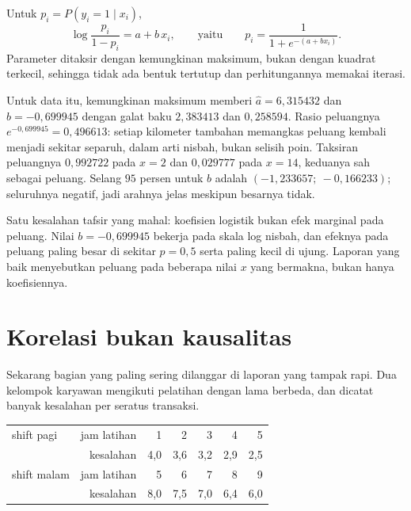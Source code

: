 \begin{definisi}
Untuk $p_i=P(y_i=1\mid x_i)$,
\[
\log\frac{p_i}{1-p_i}=a+b\,x_i,
\qquad\text{yaitu}\qquad
p_i=\frac{1}{1+e^{-(a+bx_i)}} .
\]
Parameter ditaksir dengan kemungkinan maksimum, bukan dengan kuadrat terkecil, sehingga
tidak ada bentuk tertutup dan perhitungannya memakai iterasi.
\end{definisi}


Untuk data itu, kemungkinan maksimum memberi $\hat a=6{,}315432$ dan $\hat b=-0{,}699945$
dengan galat baku $2{,}383413$ dan $0{,}258594$. Rasio peluangnya
$e^{-0{,}699945}=0{,}496613$: setiap kilometer tambahan memangkas peluang kembali
menjadi sekitar separuh, dalam arti nisbah, bukan selisih poin. Taksiran peluangnya
$0{,}992722$ pada $x=2$ dan $0{,}029777$ pada $x=14$, keduanya sah sebagai peluang.
Selang $95$ persen untuk $b$ adalah $(-1{,}233657;\ -0{,}166233)$; seluruhnya negatif,
jadi arahnya jelas meskipun besarnya tidak.

Satu kesalahan tafsir yang mahal: koefisien logistik bukan efek marginal pada peluang.
Nilai $b=-0{,}699945$ bekerja pada skala log nisbah, dan efeknya pada peluang paling
besar di sekitar $p=0{,}5$ serta paling kecil di ujung. Laporan yang baik menyebutkan
peluang pada beberapa nilai $x$ yang bermakna, bukan hanya koefisiennya.

\section{Korelasi bukan kausalitas}

Sekarang bagian yang paling sering dilanggar di laporan yang tampak rapi. Dua kelompok
karyawan mengikuti pelatihan dengan lama berbeda, dan dicatat banyak kesalahan per
seratus transaksi.

\begin{center}
\small
\begin{tabular}{l*{6}{r}}
\hline
shift pagi  & jam latihan & 1 & 2 & 3 & 4 & 5 \\
            & kesalahan   & 4,0 & 3,6 & 3,2 & 2,9 & 2,5 \\
\hline
shift malam & jam latihan & 5 & 6 & 7 & 8 & 9 \\
            & kesalahan   & 8,0 & 7,5 & 7,0 & 6,4 & 6,0 \\
\hline
\end{tabular}
\end{center}

